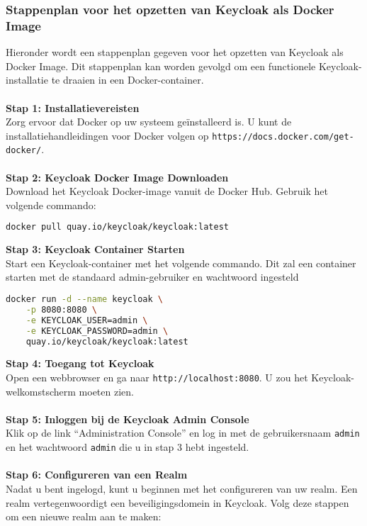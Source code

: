 \subsubsection{Stappenplan voor het opzetten van Keycloak als Docker Image}%
\label{subsubsec:keycloak-setup}
Hieronder wordt een stappenplan gegeven voor het opzetten van Keycloak als Docker Image. Dit stappenplan kan worden gevolgd om een functionele Keycloak-installatie te draaien in een Docker-container.\\\\
\textbf{Stap 1: Installatievereisten}\\
Zorg ervoor dat Docker op uw systeem geïnstalleerd is. U kunt de installatiehandleidingen voor Docker volgen op \texttt{https://docs.docker.com/get-docker/}.\\\\
\textbf{Stap 2: Keycloak Docker Image Downloaden}\\
Download het Keycloak Docker-image vanuit de Docker Hub. Gebruik het volgende commando:
\begin{lstlisting}[language=bash]
docker pull quay.io/keycloak/keycloak:latest
\end{lstlisting}
\textbf{Stap 3: Keycloak Container Starten}\\
Start een Keycloak-container met het volgende commando. Dit zal een container starten met de standaard admin-gebruiker en wachtwoord ingesteld
\begin{lstlisting}[language=bash]
docker run -d --name keycloak \
    -p 8080:8080 \
    -e KEYCLOAK_USER=admin \
    -e KEYCLOAK_PASSWORD=admin \
    quay.io/keycloak/keycloak:latest
\end{lstlisting}
\textbf{Stap 4: Toegang tot Keycloak}\\
Open een webbrowser en ga naar \texttt{http://localhost:8080}. U zou het Keycloak-welkomstscherm moeten zien.\\\\
\textbf{Stap 5: Inloggen bij de Keycloak Admin Console}\\
Klik op de link ``Administration Console'' en log in met de gebruikersnaam \texttt{admin} en het wachtwoord \texttt{admin} die u in stap 3 hebt ingesteld.\\\\
\textbf{Stap 6: Configureren van een Realm}\\
Nadat u bent ingelogd, kunt u beginnen met het configureren van uw realm. Een realm vertegenwoordigt een beveiligingsdomein in Keycloak. Volg deze stappen om een nieuwe realm aan te maken:
